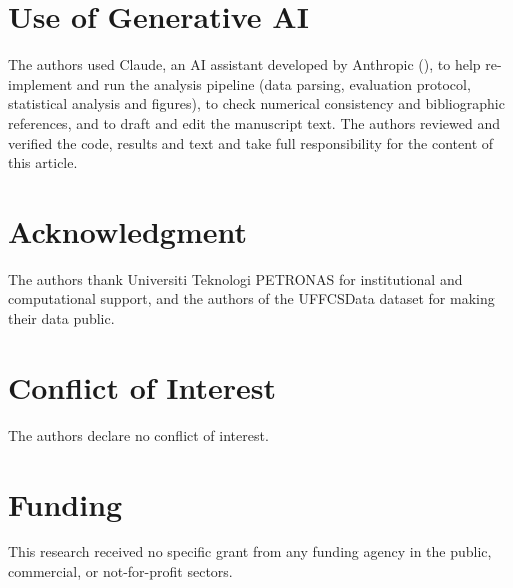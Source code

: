 \section*{Use of Generative AI}
The authors used Claude, an AI assistant developed by Anthropic (), to help re-implement and run the analysis pipeline (data parsing, evaluation protocol, statistical analysis and figures), to check numerical consistency and bibliographic references, and to draft and edit the manuscript text. The authors reviewed and verified the code, results and text and take full responsibility for the content of this article. 

\section*{Acknowledgment}
The authors thank Universiti Teknologi PETRONAS for institutional and computational support, and the authors of the UFFCSData dataset for making their data public.

\section*{Conflict of Interest}
The authors declare no conflict of interest.

\section*{Funding}
This research received no specific grant from any funding agency in the public, commercial, or not-for-profit sectors.
